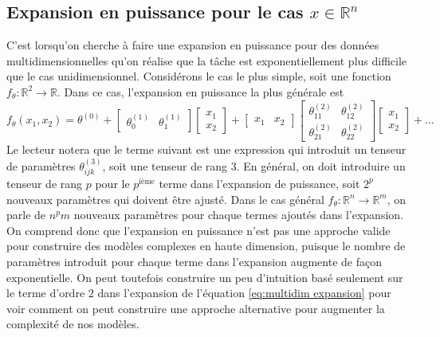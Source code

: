 \subsection{Expansion en puissance pour le cas $x \in \mathbb{R}^n$}
C'est lorsqu'on cherche à faire une expansion en puissance pour des données multidimensionnelles qu'on réalise que la tâche 
est exponentiellement plus difficile que le cas unidimensionnel. Considérons le cas le plus simple, soit une fonction 
$f_\theta : \mathbb{R}^2 \rightarrow \mathbb{R}$. Dans ce cas, l'expansion en puissance la plus générale est
\begin{equation}\label{eq:multidim expansion}
        f_\theta(x_1, x_2) = \theta^{(0)} 
        + 
        \begin{bmatrix}
                \theta^{(1)}_0 & \theta^{(1)}_1 
        \end{bmatrix}
        \begin{bmatrix}
               x_1 \\
               x_2
        \end{bmatrix}
        +
        \begin{bmatrix}
                x_1 & x_2 
        \end{bmatrix}
        \begin{bmatrix}
                \theta^{(2)}_{11} & \theta^{(2)}_{12} \\
                \theta^{(2)}_{21} & \theta^{(2)}_{22}
        \end{bmatrix}
        \begin{bmatrix}
                x_1 \\ x_2
        \end{bmatrix}
        + \dots
\end{equation} 
Le lecteur notera que le terme suivant est une expression qui introduit un tenseur de paramètres $\theta^{(3)}_{ijk}$, soit une tenseur de rang $3$. En général, 
on doit introduire un tenseur de rang $p$ pour le $p^{\text{ième}}$ terme dans l'expansion de puissance, soit $2^p$ nouveaux paramètres qui doivent être ajusté. Dans 
le cas général $f_\theta: \mathbb{R}^n \rightarrow \mathbb{R}^m$, on parle de $n^pm$ nouveaux paramètres pour chaque termes ajoutés dans l'expansion. On comprend donc 
que l'expansion en puissance n'est pas une approche valide pour construire des modèles complexes en haute dimension, puisque le nombre de paramètres introduit 
pour chaque terme dans l'expansion augmente de façon exponentielle. On peut toutefois construire 
un peu d'intuition basé seulement sur le terme d'ordre $2$ dans l'expansion de l'équation \eqref{eq:multidim expansion} pour voir comment on peut construire une approche alternative 
pour augmenter la complexité de nos modèles.




